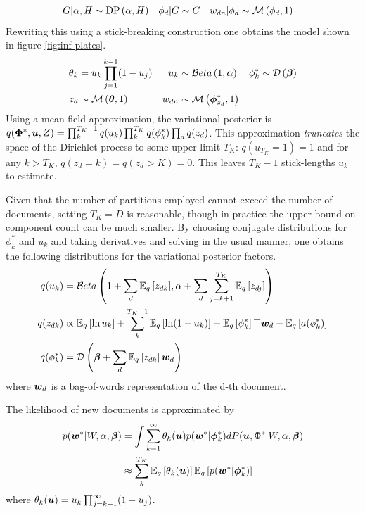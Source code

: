 \begin{align}
G|\alpha, H & \sim \DP{\alpha, H} &
\phi_d|G & \sim G &
w_{dn}|\phi_d & \sim \muln{\phi_d}{1}
\end{align}
Rewriting this using a stick-breaking construction one obtains the model shown in figure \ref{fig:inf-plates}.
\begin{align}
\theta_k & = u_k \prod_{j=1}^{k-1} (1-u_j) &
u_k & \sim \betadist{1}{\alpha} &
\phi^*_k & \sim \dir{\vv{\beta}} \\ 
z_d & \sim \muln{\vv{\theta}}{1} &
w_{dn} & \sim \muln{\vv{\phi^*_{z_d}}}{1}
\end{align}
Using a mean-field approximation, the variational posterior is $q(\vv{\Phi^*}, \vv{u}, Z) = \prod_k^{T_K - 1} q(u_k) \prod_k^{T_K}q(\phi^*_k) \prod_d q(z_d)$. This approximation \emph{truncates} the space of the Dirichlet process to some upper limit $T_K$: $q(u_{T_K} = 1) = 1$ and for any $k > T_K$, $q(z_d = k) = q(z_d > K) = 0$. This leaves $T_K -1$ stick-lengths $u_k$ to estimate.

Given that the number of partitions employed cannot exceed the number of documents, setting $T_K = D$ is reasonable, though in practice the upper-bound on component count can be much smaller. By choosing conjugate distributions for $\phi^*_k$ and $u_k$ and taking derivatives and solving in the usual manner, one obtains the following distributions for the variational posterior factors.
\begin{align}
q(u_k) & =
    \betadist{
        1 + \sum_d \ex{z_{dk}}{q}
       }{
           \alpha + \sum_d \sum_{j={k+1}}^{T_K} \ex{z_{dj}}{q}
       } \\
q(z_{dk}) & \propto 
    \ex{\ln u_k}{q} 
    + \sum_{k}^{T_K-1}
        \ex{\ln (1 - u_k)}{q}
        + \ex{\phi^*_k}{q}\top \wdoc
        - \ex{a(\phi^*_k)}{q} \\
q(\phi^*_k) & =
    \dir{
        \vv{\beta} + \sum_d \ex{z_{dk}}{q} \wdoc
    }
\end{align}
where $\vv{w}_d$ is a bag-of-words representation of the d-th document.

The likelihood of new documents is approximated by
\begin{align}
p(\vv{w}^* | W, \alpha, \vv{\beta})
    &= \int
        \sum_{k=1}^\infty \theta_k(\vv{u}) p(\vv{w}^* | \vv{\phi}^*_k)
        dP(\vv{u}, \Phi^* | W, \alpha, \vv{\beta}) \\
    &\approx \sum_k^{T_K} \ex{\theta_k(\vv{u})}{q} \ex{p(\vv{w}^* | \vv{\phi}^*_k)}{q}
\end{align}
where $\theta_k(\vv{u}) = u_k \prod_{j=k+1}^\infty (1 - u_j)$.


